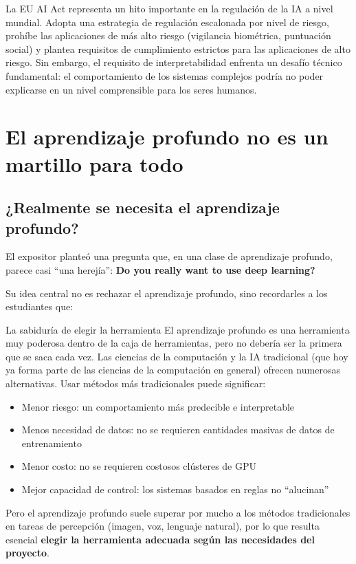 \documentclass[a4paper]{article}
\begin{document}
La EU AI Act representa un hito importante en la regulación de la IA a nivel mundial. Adopta una estrategia de regulación escalonada por nivel de riesgo, prohíbe las aplicaciones de más alto riesgo (vigilancia biométrica, puntuación social) y plantea requisitos de cumplimiento estrictos para las aplicaciones de alto riesgo. Sin embargo, el requisito de interpretabilidad enfrenta un desafío técnico fundamental: el comportamiento de los sistemas complejos podría no poder explicarse en un nivel comprensible para los seres humanos.

\section{El aprendizaje profundo no es un martillo para todo}

\subsection{¿Realmente se necesita el aprendizaje profundo?}

El expositor planteó una pregunta que, en una clase de aprendizaje profundo, parece casi ``una herejía'': \textbf{Do you really want to use deep learning?}

Su idea central no es rechazar el aprendizaje profundo, sino recordarles a los estudiantes que:

\begin{knowledgebox}{La sabiduría de elegir la herramienta}
El aprendizaje profundo es una herramienta muy poderosa dentro de la caja de herramientas, pero no debería ser la primera que se saca cada vez. Las ciencias de la computación y la IA tradicional (que hoy ya forma parte de las ciencias de la computación en general) ofrecen numerosas alternativas. Usar métodos más tradicionales puede significar:
\begin{itemize}
    \item Menor riesgo: un comportamiento más predecible e interpretable
    \item Menos necesidad de datos: no se requieren cantidades masivas de datos de entrenamiento
    \item Menor costo: no se requieren costosos clústeres de GPU
    \item Mejor capacidad de control: los sistemas basados en reglas no ``alucinan''
\end{itemize}
Pero el aprendizaje profundo suele superar por mucho a los métodos tradicionales en tareas de percepción (imagen, voz, lenguaje natural), por lo que resulta esencial \textbf{elegir la herramienta adecuada según las necesidades del proyecto}.
\end{knowledgebox}
\end{document}
